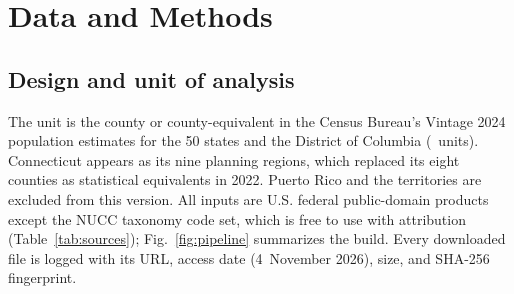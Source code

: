 \documentclass[10pt,twocolumn,letterpaper]{article}
\begin{document}
\section{Data and Methods}

\subsection{Design and unit of analysis}

The unit is the county or county-equivalent in the Census Bureau's Vintage 2024 population estimates for the 50 states and the District of Columbia (\NCounties\ units). Connecticut appears as its nine planning regions, which replaced its eight counties as statistical equivalents in 2022. Puerto Rico and the territories are excluded from this version. All inputs are U.S. federal public-domain products except the NUCC taxonomy code set, which is free to use with attribution (Table~\ref{tab:sources}); Fig.~\ref{fig:pipeline} summarizes the build. Every downloaded file is logged with its URL, access date (4~November 2026), size, and SHA-256 fingerprint.
\end{document}
